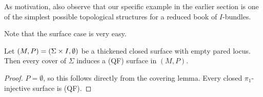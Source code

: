 As motivation, also observe that our specific example in the earlier section is
one of the simplest possible topological structures for a reduced book of
$I$-bundles.

Note that the surface case is very easy.

\begin{prop}

Let $(M,P) = (\Sigma \times I, \emptyset)$ be a thickened closed surface with
empty pared locus. Then every cover of $\Sigma$ induces a (QF) surface
in $(M,P)$.

\end{prop}

\begin{proof}

$P = \emptyset$, so this follows directly from the covering lemma. Every closed
$\pi_1$-injective surface is (QF).

\end{proof}
